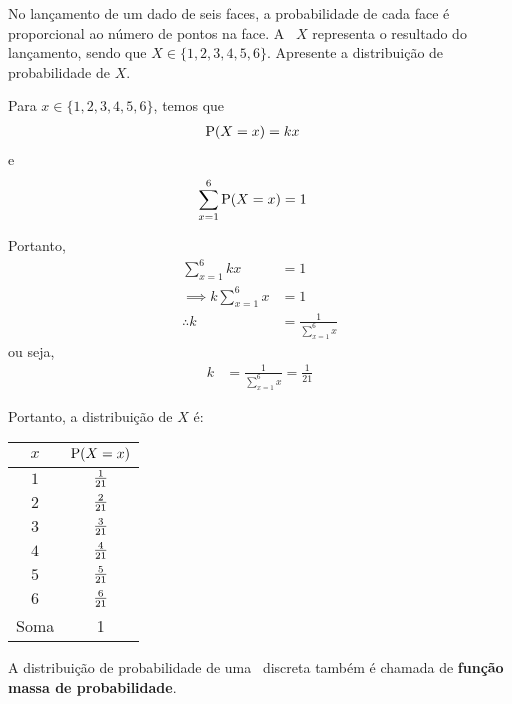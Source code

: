 \begin{example}
    No lançamento de um dado de seis faces, a probabilidade de cada face
    é proporcional ao número de pontos na face. A \va\ $X$ representa 
    o resultado do lançamento, sendo que $X \in \{1,2,3,4,5,6\}$.
    Apresente a distribuição de probabilidade de $X$.

    \bigskip
    Para $x \in \{1,2,3,4,5,6\}$, temos que
    \begin{align*}
        \operatorname{P}(X = x) &= kx
    \end{align*}
    e
    \begin{align*}
        \sum_{x=1}^6 \operatorname{P}(X = x) &= 1
    \end{align*}

    Portanto,
    \begin{align*}
        \sum_{x=1}^6 kx &= 1 \\
        \implies k \sum_{x=1}^6 x &= 1 \\
        \therefore k &= \frac{1}{\sum_{x=1}^6 x}
    \end{align*}
    ou seja,
    \begin{align*}
        k &= \frac{1}{\sum_{x=1}^6 x} = \frac{1}{21}
    \end{align*}

    Portanto, a distribuição de $X$ é:
    \begin{center}
        \begin{tabular}{cc}
            \toprule
            $x$ & $\operatorname{P}(X=x)$ \\
            \midrule
            $1$ & ${\textstyle\frac{1}{21}}$ \\
            $2$ & ${\textstyle\frac{2}{21}}$ \\
            $3$ & ${\textstyle\frac{3}{21}}$ \\
            $4$ & ${\textstyle\frac{4}{21}}$ \\
            $5$ & ${\textstyle\frac{5}{21}}$ \\
            $6$ & ${\textstyle\frac{6}{21}}$ \\
            \midrule
            Soma & 1 \\
            \bottomrule
        \end{tabular}
    \end{center}
\end{example}

\begin{obs}
    A distribuição de probabilidade de uma \va\ discreta também é chamada
    de \textbf{função massa de probabilidade}.
\end{obs}

